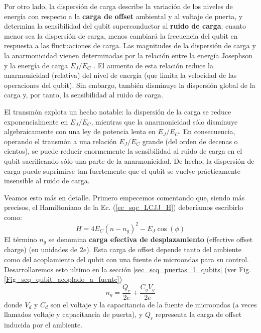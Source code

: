     Por otro lado, la dispersión de carga describe la variación de los niveles de energía con respecto a la \textbf{carga de offset} ambiental y al voltaje de puerta, y determina la sensibilidad del qubit superconductor al \textbf{ruido de carga}: cuanto menor sea la dispersión de carga, menos cambiará la frecuencia del qubit en respuesta a las fluctuaciones de carga. Las magnitudes de la dispersión de carga y la anarmonicidad vienen determinadas por la relación entre la energía Josephson y la energía de carga $E_J/E_C$ . El aumento de esta relación reduce la anarmonicidad (relativa) del nivel de energía (que limita la velocidad de las operaciones del qubit). Sin embargo, también disminuye la dispersión global de la carga y, por tanto, la sensibilidad al ruido de carga.

    El transmón \cite{bib_transmon_first_paper} explota un hecho notable: la dispersión de la carga se reduce exponencialmente en $E_J/E_C$, mientras que la anarmonicidad sólo disminuye algebraicamente con una ley de potencia lenta en $E_J/E_C$. En consecuencia, operando el transmón a una relación $E_J/E_C$ grande (del orden de decenas o cientos), se puede reducir enormemente la sensibilidad al ruido de carga en el qubit sacrificando sólo una parte de la anarmonicidad. De hecho, la dispersión de carga puede suprimirse tan fuertemente que el qubit se vuelve prácticamente insensible al ruido de carga. 


    Veamos esto más en detalle. Primero empecemos comentando que, siendo más precisos, el Hamiltoniano de la Ec. (\ref{ec_sqc_LCJJ_H}) deberíamos escribirlo como:
    \begin{equation}  \label{ec_sqc_transmon_H_offset}
            H = 4 E_C (n-n_g)^2 - E_J \cos (\phi)
    \end{equation}
    El término $n_g$ se denomina \textbf{carga efectiva de desplazamiento} (effective offset charge) (en unidades de $2e$). Esta carga de offset depende tanto del ambiente como del acoplamiento del qubit con una fuente de microondas para su control. Desarrollaremos esto ultimo en la sección \ref{sec_scq_puertas_1_qubits} (ver Fig. \ref{Fig_scq_qubit_acoplado_a_fuente}) 
    \begin{equation}
        n_g = \frac{Q_r}{2e} + \frac{C_g V_g}{2e}
    \end{equation}
    donde $V_d$ y $C_d$ son el voltaje y la capacitancia de la fuente de microondas (a veces llamados voltaje y capacitancia de puerta), y $Q_r$ representa la carga de offset inducida por el ambiente. 

